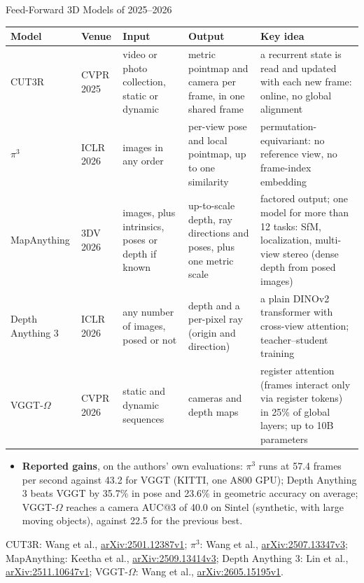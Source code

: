 \begin{frame}{Feed-Forward 3D Models of 2025--2026}
  \centering
  {\scriptsize\setlength{\tabcolsep}{4pt}
  \begin{tabular}{>{\raggedright\arraybackslash}p{1.6cm} >{\raggedright\arraybackslash}p{1.3cm} >{\raggedright\arraybackslash}p{2.0cm} >{\raggedright\arraybackslash}p{2.8cm} >{\raggedright\arraybackslash}p{4.7cm}}
    \toprule
    \textbf{Model} & \textbf{Venue} & \textbf{Input} & \textbf{Output} & \textbf{Key idea} \\
    \midrule
    CUT3R & CVPR 2025 & video or photo collection, static or dynamic & metric pointmap and camera per frame, in one shared frame & a recurrent state is read and updated with each new frame: online, no global alignment \\
    \addlinespace[0.1em]
    $\pi^3$ & ICLR 2026 & images in any order & per-view pose and local pointmap, up to one similarity & permutation-equivariant: no reference view, no frame-index embedding \\
    \addlinespace[0.1em]
    MapAnything & 3DV 2026 & images, plus intrinsics, poses or depth if known & up-to-scale depth, ray directions and poses, plus one metric scale & factored output; one model for more than 12 tasks: SfM, localization, multi-view stereo (dense depth from posed images) \\
    \addlinespace[0.1em]
    Depth Anything 3 & ICLR 2026 & any number of images, posed or not & depth and a per-pixel ray (origin and direction) & a plain DINOv2 transformer with cross-view attention; teacher--student training \\
    \addlinespace[0.1em]
    VGGT-$\Omega$ & CVPR 2026 & static and dynamic sequences & cameras and depth maps & register attention (frames interact only via register tokens) in 25\% of global layers; up to 10B parameters \\
    \bottomrule
  \end{tabular}\par}
  \begin{itemize}\scriptsize\itemsep0.1em
    \item \textbf{Reported gains}, on the authors' own evaluations: $\pi^3$ runs at 57.4 frames per second against 43.2 for VGGT (KITTI, one A800 GPU); Depth Anything 3 beats VGGT by 35.7\% in pose and 23.6\% in geometric accuracy on average; VGGT-$\Omega$ reaches a camera AUC@3 of 40.0 on Sintel (synthetic, with large moving objects), against 22.5 for the previous best.
  \end{itemize}
  {\scriptsize CUT3R: Wang et al., \href{https://arxiv.org/abs/2501.12387v1}{arXiv:2501.12387v1}; $\pi^3$: Wang et al., \href{https://arxiv.org/abs/2507.13347v3}{arXiv:2507.13347v3}; MapAnything: Keetha et al., \href{https://arxiv.org/abs/2509.13414v3}{arXiv:2509.13414v3}; Depth Anything 3: Lin et al., \href{https://arxiv.org/abs/2511.10647v1}{arXiv:2511.10647v1}; VGGT-$\Omega$: Wang et al., \href{https://arxiv.org/abs/2605.15195v1}{arXiv:2605.15195v1}.\par}
\end{frame}

